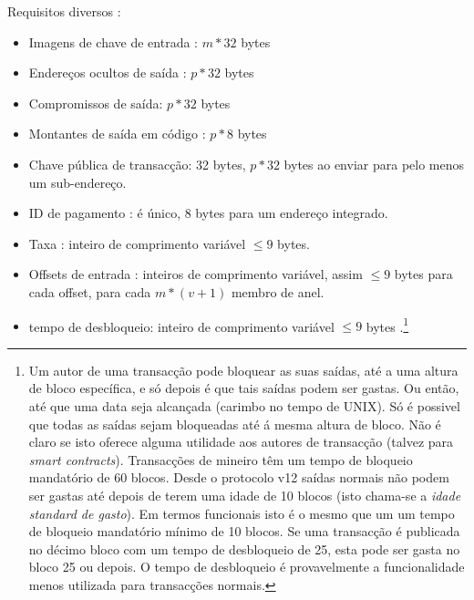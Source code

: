 Requisitos diversos :
\begin{itemize}
    \setlength\itemsep{\listspace}
    \item Imagens de chave de entrada : $m*32$ bytes
    \item Endereços ocultos de saída : $p*32$ bytes
    \item Compromissos de saída: $p*32$ bytes
    \item Montantes de saída em código : $p*8$ bytes
    \item Chave pública de transacção: 32 bytes, $p*32$ bytes ao enviar para pelo menos um sub-endereço.
    \item ID de pagamento : é único, 8 bytes para um endereço integrado.
    \item Taxa : inteiro de comprimento variável  $\leq 9$ bytes.
    \item Offsets de entrada : inteiros de comprimento variável, assim $\leq 9$ bytes para cada offset, para cada $m*(v+1)$ membro de anel.
    \item tempo de desbloqueio: inteiro de comprimento variável $\leq 9$ bytes .\footnote{Um autor de uma transacção pode bloquear as suas saídas, até a uma altura de bloco específica, e só depois é que tais saídas podem ser gastas. Ou então, até que uma data seja alcançada (carimbo no tempo de UNIX). Só é possivel que todas as saídas sejam bloqueadas até á mesma altura de bloco. Não é claro se isto oferece alguma utilidade aos autores de transacção (talvez para {\em smart contracts}). Transacções de mineiro têm um tempo de bloqueio mandatório de 60 blocos. Desde o protocolo v12 saídas normais não podem ser gastas até depois de terem uma idade de 10 blocos (isto chama-se a {\em idade standard de gasto}). Em termos funcionais isto é o mesmo que um um tempo de bloqueio mandatório mínimo de 10 blocos. Se uma transacção é publicada no décimo bloco com um tempo de desbloqueio de 25, esta pode ser gasta no bloco 25 ou depois. O tempo de desbloqueio é provavelmente a funcionalidade menos utilizada para transacções normais.}

\end{itemize}
